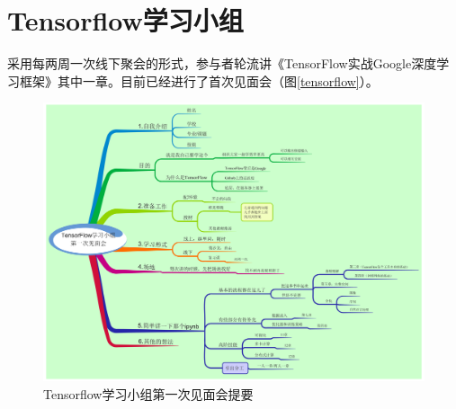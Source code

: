 \documentclass[12pt]{ctexart}
\begin{document}
\section{Tensorflow学习小组}
采用每两周一次线下聚会的形式，参与者轮流讲《TensorFlow实战Google深度学习框架》其中一章。目前已经进行了首次见面会（图\ref{tensorflow}）。
\begin{figure}[!ht]
\centering
\includegraphics[width=12cm]{tensorflow_plan.pdf}
\caption{Tensorflow学习小组第一次见面会提要}        
\end{figure}
\end{document}

